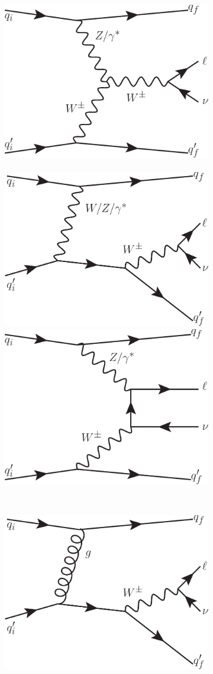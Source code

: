 \documentclass{PoS}
\begin{document}
\begin{figure}[t!]
  \centering
  \begin{subfigure}[t]{0.74\textwidth}
    \centering
    \includegraphics[width=.35\textwidth]{STDM-2014-11/fig_01a.pdf}~~
    \includegraphics[width=.35\textwidth]{STDM-2014-11/fig_01b.pdf}\\ \vspace{5mm}
    \includegraphics[width=.35\textwidth]{STDM-2014-11/fig_01c.pdf}
    \caption{}
  \end{subfigure}%
  ~
  \begin{subfigure}[t]{0.26\textwidth}
    \centering
    \includegraphics[width=.99\textwidth]{STDM-2014-11/fig_02a.pdf}\\ \vspace{5mm}

\end{subfigure}
\end{figure}
\end{document}
